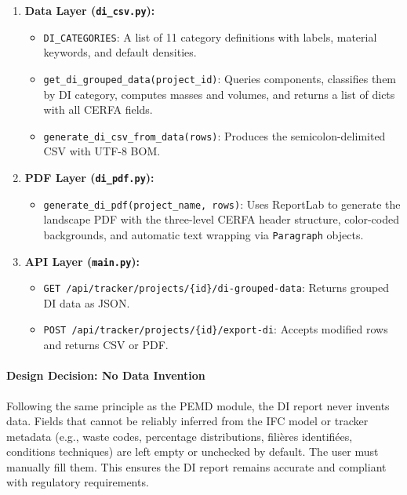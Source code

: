 \documentclass[11pt,a4paper]{article}
\begin{document}
\begin{enumerate}[leftmargin=*]
    \item \textbf{Data Layer (\texttt{di\_csv.py}):}
    \begin{itemize}
        \item \texttt{DI\_CATEGORIES}: A list of 11 category definitions with labels, material keywords, and default densities.
        \item \texttt{get\_di\_grouped\_data(project\_id)}: Queries components, classifies them by DI category, computes masses and volumes, and returns a list of dicts with all CERFA fields.
        \item \texttt{generate\_di\_csv\_from\_data(rows)}: Produces the semicolon-delimited CSV with UTF-8 BOM.
    \end{itemize}
    
    \item \textbf{PDF Layer (\texttt{di\_pdf.py}):}
    \begin{itemize}
        \item \texttt{generate\_di\_pdf(project\_name, rows)}: Uses ReportLab to generate the landscape PDF with the three-level CERFA header structure, color-coded backgrounds, and automatic text wrapping via \texttt{Paragraph} objects.
    \end{itemize}
    
    \item \textbf{API Layer (\texttt{main.py}):}
    \begin{itemize}
        \item \texttt{GET /api/tracker/projects/\{id\}/di-grouped-data}: Returns grouped DI data as JSON.
        \item \texttt{POST /api/tracker/projects/\{id\}/export-di}: Accepts modified rows and returns CSV or PDF.
    \end{itemize}
\end{enumerate}

\paragraph{Design Decision: No Data Invention}

Following the same principle as the PEMD module, the DI report never invents data. Fields that cannot be reliably inferred from the IFC model or tracker metadata (e.g., waste codes, percentage distributions, fili\`{e}res identifi\'{e}es, conditions techniques) are left empty or unchecked by default. The user must manually fill them. This ensures the DI report remains accurate and compliant with regulatory requirements.
\end{document}
